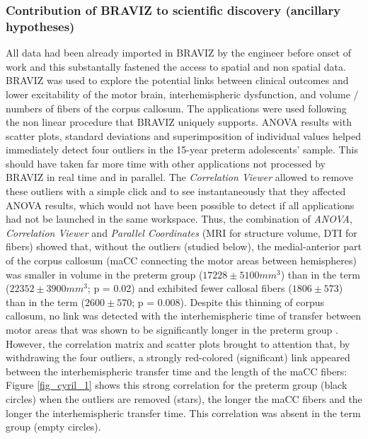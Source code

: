 \documentclass{frontiersHLTH}
\begin{document}
\subsubsection{Contribution of BRAVIZ to scientific discovery (ancillary hypotheses)}

All data had been already imported in BRAVIZ by the engineer before onset of work and this substantally fastened the access to spatial and non spatial data. BRAVIZ was used to explore the potential links between clinical outcomes and lower excitability of the motor brain, interhemispheric dysfunction, and volume / numbers of fibers of the corpus callosum. The applications were used following the non linear procedure that BRAVIZ uniquely supports. ANOVA results with scatter plots, standard deviations and superimposition of individual values helped immediately detect four outliers in the 15-year preterm adolescents’ sample. This should have taken far more time with other applications not processed by BRAVIZ in real time and in parallel. The \emph{Correlation Viewer} allowed to remove these outliers with a simple click and to see instantaneously that they affected ANOVA results, which would not have been possible to detect if all applications had not be launched in the same workspace. Thus, the combination of \emph{ANOVA}, \emph{Correlation Viewer} and \emph{Parallel Coordinates} (MRI for structure volume, DTI for fibers) showed that,  without the outliers (studied below), the medial-anterior part of the corpus callosum (maCC connecting the motor areas between hemispheres) was smaller in volume in the preterm group ($17228 \pm 5100 mm^3$) than in the term ($22352 \pm 3900mm^3$; p = 0.02) and exhibited fewer callosal fibers ($1806 \pm 573$) than in the term ($2600 \pm 570$; p = 0.008). Despite this thinning of corpus callosum, no link was detected with the interhemispheric time of transfer between motor areas that was shown to be significantly longer in the preterm group \cite{schneider_cerebral_2012}. However, the correlation matrix and scatter plots brought to attention that, by withdrawing the four outliers, a strongly red-colored (significant) link appeared between  the interhemispheric transfer time and the length of the maCC fibers: Figure \ref{fig_cyril_1} shows this strong correlation for the preterm group (black circles) when the outliers are removed (stars), the longer the maCC fibers and the longer the interhemispheric transfer time. This correlation was absent in the term group (empty circles). 
\end{document}
